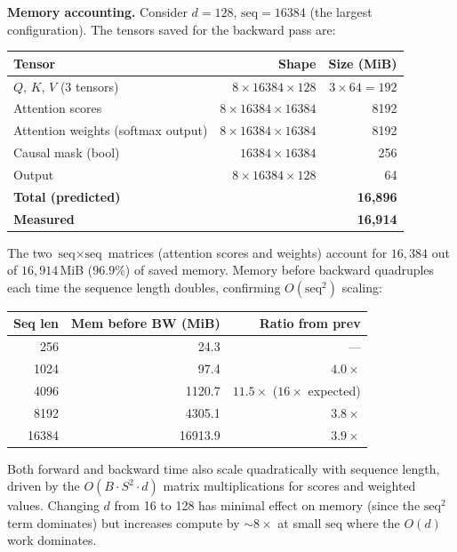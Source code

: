 \documentclass[11pt]{article}
\begin{document}
\medskip\noindent\textbf{Memory accounting.}
Consider $d{=}128$, $\text{seq}{=}16384$ (the largest configuration).
The tensors saved for the backward pass are:

\begin{center}
\small
\begin{tabular}{l r r}
\toprule
Tensor & Shape & Size (MiB) \\
\midrule
$Q$, $K$, $V$ (3 tensors) & $8 \times 16384 \times 128$ & $3 \times 64 = 192$ \\
Attention scores & $8 \times 16384 \times 16384$ & 8192 \\
Attention weights (softmax output) & $8 \times 16384 \times 16384$ & 8192 \\
Causal mask (bool) & $16384 \times 16384$ & 256 \\
Output & $8 \times 16384 \times 128$ & 64 \\
\midrule
\textbf{Total (predicted)} & & \textbf{16,896} \\
\textbf{Measured} & & \textbf{16,914} \\
\bottomrule
\end{tabular}
\end{center}

The two $\text{seq}\times\text{seq}$ matrices (attention scores and
weights) account for $16{,}384$ out of $16{,}914$\,MiB
($\mathbf{96.9\%}$) of saved memory.  Memory before backward quadruples
each time the sequence length doubles, confirming $O(\text{seq}^2)$
scaling:

\begin{center}
\small
\begin{tabular}{r r r}
\toprule
Seq len & Mem before BW (MiB) & Ratio from prev \\
\midrule
256   &    24.3 & --- \\
1024  &    97.4 & $4.0\times$ \\
4096  &  1120.7 & $11.5\times$ ($16\times$ expected) \\
8192  &  4305.1 & $3.8\times$ \\
16384 & 16913.9 & $3.9\times$ \\
\bottomrule
\end{tabular}
\end{center}

Both forward and backward time also scale quadratically with sequence
length, driven by the $O(B\cdot S^2\cdot d)$ matrix multiplications
for scores and weighted values.  Changing $d$ from 16 to 128 has minimal
effect on memory (since the $\text{seq}^2$ term dominates) but
increases compute by $\sim8\times$ at small $\text{seq}$ where the
$O(d)$ work dominates.
\end{document}
